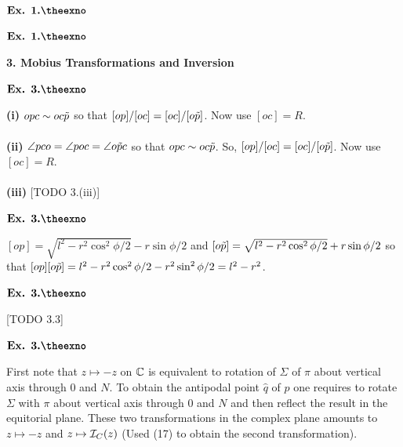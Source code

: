 \documentclass{article}
\def\tf{\textbf}
\def\mc{\ensuremath\mathcal}
\def\mb{\ensuremath\mathbb}
\def\td{\ensuremath\tilde}
\def\C{\ensuremath\mb{C}}
\newcounter{exno}
\begin{document}
\vspace{0.2in}

${\textbf{Ex. 1.\theexno}}$
\addtocounter{exno}{1}

\vspace{0.2in}

${\textbf{Ex. 1.\theexno}}$
\addtocounter{exno}{1}

\vspace{0.2in}

\clearpage
\setcounter{exno}{1}

\begin{center}
    \textbf{\large{3. Mobius Transformations and Inversion}}
\end{center}

${\textbf{Ex. 3.\theexno}}$
\addtocounter{exno}{1}

\tf{(i)} $opc \sim oc\td{p}$ so that $[op]/[oc]=[oc]/[o\td{p}]$. Now use $[oc]=R$.\\~\\

\tf{(ii)} $\angle pco = \angle poc = \angle o\td{p}c$ so that $opc \sim oc\td{p}$. So, $[op]/[oc] = [oc]/[o\td{p}]$. Now use $[oc]=R$.\\~\\

\tf{(iii)} [TODO 3.(iii)]

\vspace{0.2in}

${\textbf{Ex. 3.\theexno}}$
\addtocounter{exno}{1}

$[op] = \sqrt{l^2-r^2\cos^2\phi/2} - r\sin\phi/2$ and $[o\td{p}] = \sqrt{l^2-r^2\cos^2\phi/2} + r\sin\phi/2$ so that $[op][o\td{p}] = l^2-r^2\cos^2\phi/2 - r^2\sin^2\phi/2 = l^2-r^2$.

\vspace{0.2in}

${\textbf{Ex. 3.\theexno}}$
\addtocounter{exno}{1}

[TODO 3.3]

\vspace{0.2in}

${\textbf{Ex. 3.\theexno}}$
\addtocounter{exno}{1}

First note that $z \mapsto -z$ on $\C$ is equivalent to rotation of $\Sigma$ of $\pi$ about vertical axis through $0$ and $N$. To obtain the antipodal point $\hat{q}$ of $\hat{p}$ one requires to rotate $\Sigma$ with $\pi$ about vertical axis through $0$ and $N$ and then reflect the result in the equitorial plane. These two transformations in the complex plane amounts to $z\mapsto -z$ and $z \mapsto \mc{I}_C(z)$ (Used (17) to obtain the second transformation).
\end{document}
